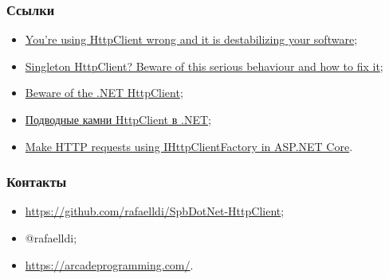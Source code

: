 \documentclass[17pt,aspectratio=169]{beamer}
\begin{document}
\begin{frame}
\frametitle{Ссылки}
\begin{itemize}
	\item \href{https://aspnetmonsters.com/2016/08/2016-08-27-httpclientwrong/}{You're using HttpClient wrong and it is destabilizing your software};
	\item \href{https://byterot.blogspot.com/2016/07/singleton-httpclient-dns.html}{Singleton HttpClient? Beware of this serious behaviour and how to fix it};
	\item \href{https://nima-ara-blog.azurewebsites.net/beware-of-the-net-httpclient/}{Beware of the .NET HttpClient};
	\item \href{https://habr.com/en/post/424873/}{Подводные камни HttpClient в .NET};
	\item \href{https://docs.microsoft.com/en-us/aspnet/core/fundamentals/http-requests?view=aspnetcore-2.2}{Make HTTP requests using IHttpClientFactory in ASP.NET Core}.
\end{itemize}
\end{frame}

\begin{frame}
\frametitle{Контакты}
\begin{itemize}
	\item \href{Слайды и примеры https://github.com/rafaelldi/SpbDotNet-HttpClient}{https://github.com/rafaelldi/SpbDotNet-HttpClient};
	\item @rafaelldi;
	\item \href{https://arcadeprogramming.com/}{https://arcadeprogramming.com/}.
\end{itemize}
\end{frame}
\end{document}
